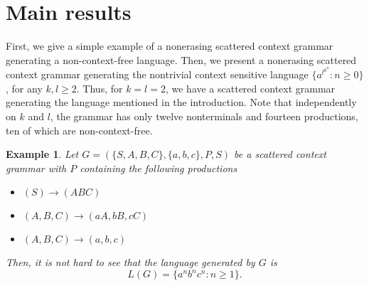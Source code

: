 \documentclass[copyright]{eptcs}
\makeatletter
\newtheorem{example}[theorem]{Example\dromanb}
\newcommand*{\dromanb}{\gdef\d@tstyle{\rmfamily\upshape\mdseries}}
\newcommand{\d@tstyle}{}
\makeatother
\begin{document}
\section{Main results}
  First, we give a simple example of a nonerasing scattered context grammar generating a non\mbox{-}context-free language. Then, we present a nonerasing scattered context grammar generating the nontrivial context sensitive language $\{a^{l^{k^n}} : n\ge 0\}$, for any $k,l\ge 2$. Thus, for $k=l=2$, we have a scattered context grammar generating the language mentioned in the introduction. Note that independently on $k$ and $l$, the grammar has only twelve nonterminals and fourteen productions, ten of which are non-context-free.
  \begin{example}
    Let $G=(\{S,A,B,C\},\{a,b,c\},P,S)$ be a scattered context grammar with $P$ containing the following productions
    \begin{itemize}
      \item $(S)\to(ABC)$
      \item $(A,B,C)\to(aA,bB,cC)$
      \item $(A,B,C)\to(a,b,c)$
    \end{itemize}
    Then, it is not hard to see that the language generated by $G$ is 
    \[L(G)=\{a^nb^nc^n : n\ge 1\}.\tag*{$\diamond$}\]
  \end{example}
\end{document}

